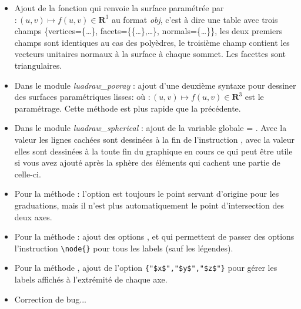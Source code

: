 \begin{itemize}
    \item Ajout de la fonction  qui renvoie la surface paramétrée par $\colon(u,v)\mapsto f(u,v)\in\mathbf R^3$ au format \emph{obj}, c'est à dire une table avec trois champs \{vertices=\{\ldots\}, facets=\{\{\ldots\},\ldots\}, normals=\{\ldots\}\}, les deux premiers champs sont identiques au cas des polyèdres, le troisième champ contient les vecteurs unitaires normaux à la surface à chaque sommet. Les facettes sont triangulaires.

    \item Dans le module \emph{luadraw\_povray} : ajout d'une deuxième syntaxe pour dessiner des surfaces paramétriques lisses:
    où $\colon(u,v)\mapsto f(u,v)\in\mathbf R^3$ est le paramétrage. Cette méthode est plus rapide que la précédente.
    
    \item Dans le module \emph{luadraw\_spherical} : ajout de la variable globale  = \false. Avec la valeur \false les lignes cachées sont dessinées à la fin de l'instruction , avec la valeur \true elles sont dessinées à la toute fin du graphique en cours ce qui peut être utile si vous avez ajouté après la sphère des éléments qui cachent une partie de celle-ci.

    \item Pour la méthode  : l'option  est toujours le point servant d'origine pour les graduations, mais il n'est plus automatiquement le point d'intersection des deux axes.

    \item Pour la méthode  : ajout des options ,  et  qui permettent de passer des options l'instruction \verb|\node{}| pour tous les labels (sauf les légendes).
    
    \item Pour la méthode , ajout de l'option \verb|{"$x$","$y$","$z$"}| pour gérer les labels affichés à l'extrémité de chaque axe.
    
    \item Correction de bug...
\end{itemize}

